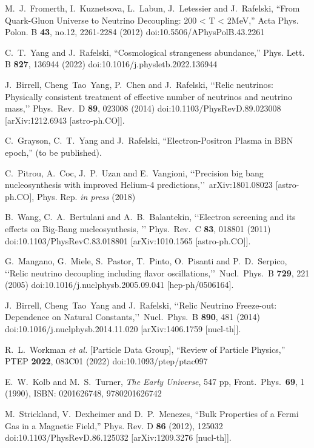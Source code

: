\begin{thebibliography}{99}
M.~J.~Fromerth, I.~Kuznetsova, L.~Labun, J.~Letessier and J.~Rafelski,
``From Quark-Gluon Universe to Neutrino Decoupling: 200 < T < 2MeV,''
Acta Phys. Polon. B \textbf{43}, no.12, 2261-2284 (2012)
doi:10.5506/APhysPolB.43.2261

C.~T.~Yang and J.~Rafelski,
``Cosmological strangeness abundance,''
Phys. Lett. B \textbf{827}, 136944 (2022)
doi:10.1016/j.physletb.2022.136944

J.~Birrell, Cheng~Tao~Yang, P.~Chen and J.~Rafelski,
\lq\lq Relic neutrinos: Physically consistent treatment of effective number of neutrinos and neutrino mass,\rq\rq
Phys.\ Rev.\ D {\bf 89}, 023008 (2014)
doi:10.1103/PhysRevD.89.023008
[arXiv:1212.6943 [astro-ph.CO]].

C.~Grayson, C.~T.~Yang and J.~Rafelski,
``Electron-Positron Plasma in BBN epoch,'' (to be published).

C.~Pitrou, A.~Coc, J.~P.~Uzan and E.~Vangioni,
\lq\lq Precision big bang nucleosynthesis with improved Helium-4 predictions,\rq\rq\ 
arXiv:1801.08023 [astro-ph.CO], Phys. Rep. {\it in press} (2018)


B.~Wang, C.~A.~Bertulani and A.~B.~Balantekin,
\lq\lq Electron screening and its effects on Big-Bang nucleosynthesis, \rq\rq
Phys.\ Rev.\ C {\bf 83}, 018801 (2011)
doi:10.1103/PhysRevC.83.018801
[arXiv:1010.1565 [astro-ph.CO]].

G.~Mangano, G.~Miele, S.~Pastor, T.~Pinto, O.~Pisanti and P.~D.~Serpico,
\lq\lq Relic neutrino decoupling including flavor oscillations,\rq\rq\
Nucl.\ Phys.\ B {\bf 729}, 221 (2005)
doi:10.1016/j.nuclphysb.2005.09.041
[hep-ph/0506164].

 J.~Birrell, Cheng~Tao~Yang and J.~Rafelski,
\lq\lq Relic Neutrino Freeze-out: Dependence on Natural Constants,\rq\rq\
 Nucl.\ Phys.\ B {\bf 890}, 481 (2014)
 doi:10.1016/j.nuclphysb.2014.11.020
 [arXiv:1406.1759 [nucl-th]].


R.~L.~Workman \textit{et al.} [Particle Data Group],
``Review of Particle Physics,''
PTEP \textbf{2022}, 083C01 (2022)
doi:10.1093/ptep/ptac097

E.~W.~Kolb and M.~S.~Turner,
\emph{The Early Universe},
547 pp, Front.\ Phys.\ {\bf 69}, 1 (1990),
ISBN: 0201626748, 9780201626742

M.~Strickland, V.~Dexheimer and D.~P.~Menezes,
``Bulk Properties of a Fermi Gas in a Magnetic Field,''
Phys. Rev. D \textbf{86} (2012), 125032
doi:10.1103/PhysRevD.86.125032
[arXiv:1209.3276 [nucl-th]].


\end{thebibliography}
